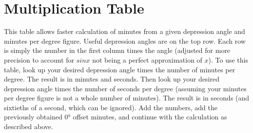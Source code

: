 \section{Multiplication Table}

This table allows faster calculation of minutes from a given depression angle and minutes per degree figure. Useful depression angles are on the top row. Each row is simply the number in the first column times the angle (adjusted for more precision to account for $sin{x}$ not being a perfect approximation of $x$). To use this table, look up your desired depression angle times the number of minutes per degree. The result is in minutes and seconds.  Then look up your desired depression angle times the number of seconds per degree (assuming your minutes per degree figure is not a whole number of minutes).  The result is in seconds (and sixtieths of a second, which can be ignored).  Add the numbers, add the previously obtained 0° offset minutes, and continue with the calculation as described above.

